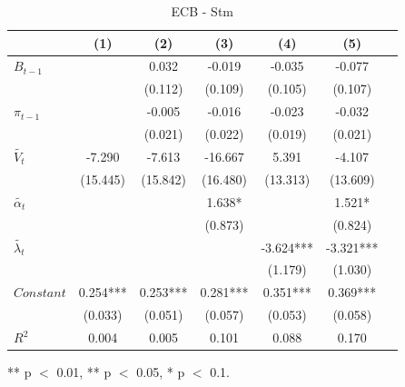 \documentclass[review]{elsarticle}
\begin{document}
\begin{table}[!ht]
\centering 
  \caption{ECB - Stm} 
  \label{tab:ECB - Stm}
\begin{tabular}{l*{6}{c}}   
\toprule
                    & (1) & (2) & (3) & (4) & (5) \\
\midrule
$B_{t-1}$           &     & 0.032 & -0.019 & -0.035 & -0.077 \\
                    &     & (0.112) & (0.109) & (0.105) & (0.107) \\
$\pi_{t-1}$         &     & -0.005 & -0.016 & -0.023 & -0.032 \\
                    &     & (0.021) & (0.022) & (0.019) & (0.021) \\
$\tilde{V_t}$       & -7.290 & -7.613 & -16.667 & 5.391 & -4.107 \\
                    & (15.445) & (15.842) & (16.480) & (13.313) & (13.609) \\
$\tilde{\alpha_t}$  &     &     & 1.638* &     & 1.521* \\
                    &     &     & (0.873) &     & (0.824) \\
$\tilde{\lambda_t}$ &     &     &     & -3.624*** & -3.321*** \\
                    &     &     &     & (1.179) & (1.030) \\
$Constant$          & 0.254*** & 0.253*** & 0.281*** & 0.351*** & 0.369*** \\
                    & (0.033) & (0.051) & (0.057) & (0.053) & (0.058) \\
\midrule
$R^2$               & 0.004 & 0.005 & 0.101 & 0.088 & 0.170 \\
\bottomrule
\end{tabular} 
\parbox{0.8\textwidth}{\centering \small *** p $<$ 0.01, ** p $<$ 0.05, * p $<$ 0.1.}
\end{table}
\end{document}
